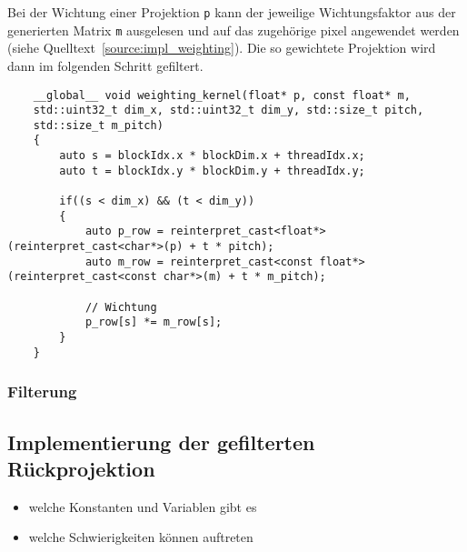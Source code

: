 Bei der Wichtung einer Projektion \texttt{p} kann der jeweilige Wichtungsfaktor aus der generierten Matrix \texttt{m}
ausgelesen und auf das zugehörige \gls{pixel} angewendet werden (siehe Quelltext~\ref{source:impl_weighting}). Die so
gewichtete Projektion wird dann im folgenden Schritt gefiltert.

\begin{code}
\begin{verbatim}
    __global__ void weighting_kernel(float* p, const float* m,
    std::uint32_t dim_x, std::uint32_t dim_y, std::size_t pitch,
    std::size_t m_pitch)
    {
        auto s = blockIdx.x * blockDim.x + threadIdx.x;
        auto t = blockIdx.y * blockDim.y + threadIdx.y;

        if((s < dim_x) && (t < dim_y))
        {
            auto p_row = reinterpret_cast<float*>(reinterpret_cast<char*>(p) + t * pitch);
            auto m_row = reinterpret_cast<const float*>(reinterpret_cast<const char*>(m) + t * m_pitch);

            // Wichtung
            p_row[s] *= m_row[s];
        }
    }
\end{verbatim}
\label{source:impl_weighting}
\end{code}

\subsubsection{Filterung}

\subsection{Implementierung der gefilterten Rückprojektion}

\begin{itemize}
    \item welche Konstanten und Variablen gibt es
    \item welche Schwierigkeiten können auftreten
\end{itemize}
